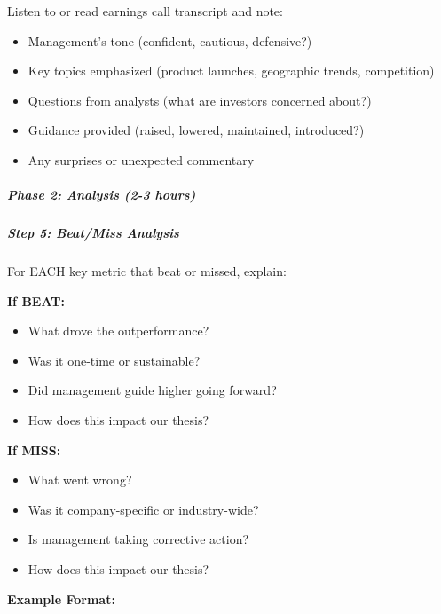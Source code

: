 \documentclass[11pt]{article}
\begin{document}
Listen to or read earnings call transcript and note:

\begin{itemize}[leftmargin=*,itemsep=2pt,topsep=2pt]
\item {} Management's tone (confident, cautious, defensive?)
\item {} Key topics emphasized (product launches, geographic trends, competition)
\item {} Questions from analysts (what are investors concerned about?)
\item {} Guidance provided (raised, lowered, maintained, introduced?)
\item {} Any surprises or unexpected commentary
\end{itemize}

\subparagraph{Phase 2: Analysis (2-3 hours)}\mbox{}\par

\subparagraph{Step 5: Beat/Miss Analysis}\mbox{}\par

For EACH key metric that beat or missed, explain:


\textbf{If BEAT:}

\begin{itemize}[leftmargin=*,itemsep=2pt,topsep=2pt]
\item {} What drove the outperformance?
\item {} Was it one-time or sustainable?
\item {} Did management guide higher going forward?
\item {} How does this impact our thesis?
\end{itemize}

\textbf{If MISS:}

\begin{itemize}[leftmargin=*,itemsep=2pt,topsep=2pt]
\item {} What went wrong?
\item {} Was it company-specific or industry-wide?
\item {} Is management taking corrective action?
\item {} How does this impact our thesis?
\end{itemize}

\textbf{Example Format:}
\end{document}
